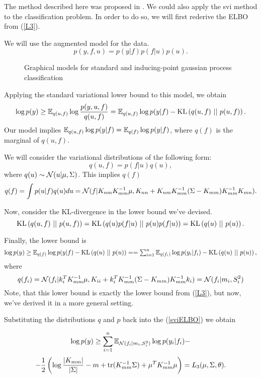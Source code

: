 The method described here was proposed in \cite{SVIclassification}. We could also apply the svi method to the classification problem. In order to do so, we will first rederive the ELBO from (\ref{L3}).

We will use the augmented model for the data.
$$p(y, f, u) = p(y | f) p(f | u) p(u).$$
\begin{figure}[!h]
	\centering
	\subfloat{
		\scalebox{0.7}{
			
		}
	}
	\hspace{1cm}
	\subfloat{
		\scalebox{0.7}{
			
		}
	}
	\caption{Graphical models for standard and inducing-point gaussian process classification}
\end{figure}

Applying the standard variational lower bound to this model, we obtain
$$\log p(y) \ge \mathbb{E}_{q(u, f)} \log \frac {p(y, u, f)}{q(u, f)} = \mathbb{E}_{q(u, f)}\log p(y | f) - \mbox{KL}\left(q(u, f)\mbox{ || }p(u, f)\right).$$
Our model implies $\mathbb{E}_{q(u, f)} \log p(y | f) = \mathbb{E}_{q(f)} \log p(y | f)$, where $q(f)$ is the marginal of $q(u, f)$.

We will consider the variational distributions of the following form:
$$q(u, f) = p(f | u) q(u),$$
where $q(u) \sim \mathcal{N}(u|\mu, \Sigma)$. This implies $q(f)$
$$q(f) = \int p(u | f) q(u) du = 
\mathcal{N}(f| K_{nm} K_{mm}^{-1} \mu, K_{nn} + K_{nm} K_{mm}^{-1}(\Sigma - K_{mm}) K_{mm}^{-1} K_{mn}).$$

Now, consider the KL-divergence in the lower bound we've devised.
$$\mbox{KL}\left(q(u, f)\mbox{ || }p(u, f)\right) = \mbox{KL}\left(q(u) p(f|u)\mbox{ || }p(u) p(f|u)\right) = \mbox{KL}\left(q(u)\mbox{ || }p(u)\right).$$

Finally, the lower bound is
\begin{equation}\label{sviELBO}
	\log p(y) \ge \E_{q(f)} \log p(y | f) - \KL{q(u)} {p(u)} = $$ $$ = \sum_{i = 1}^{n} \E_{q(f_i)} \log p(y_i | f_i) - \KL{q(u)} {p(u)},
\end{equation}
where 
$$q(f_i) = \mathcal{N}(f_i | k_i^T K_{mm}^{-1} \mu, K_{ii} + k_i^T K_{mm}^{-1} (\Sigma - K_{mm}) K_{mm}^{-1} k_{i}) = \mathcal{N}(f_i | m_i, S_i^2)$$
Note, that this lower bound is exactly the lower bound from (\ref{L3}), but now, we've derived it in a more general setting.


Substituting the distributions $q$ and $p$ back into the (\ref{sviELBO}) we obtain

$$\log p(y) \ge \sum_{i=1}^n \mathbb{E}_{\mathcal{N}(f_i | m_i, S_i^2)} \log p(y_i | f_i) -$$
\begin{equation}\label{explicit_svi_elbo}
	-\frac 1 2 \left (\log \frac {|K_{mm}|} {|\Sigma|} - m + \mbox{tr}(K_{mm}^{-1} \Sigma) + \mu^T K_{mm}^{-1} \mu \right) = L_3(\mu, \Sigma, \theta).
\end{equation}


